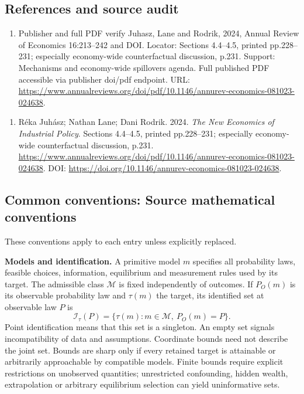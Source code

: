 \documentclass[11pt,a4paper]{article}
\begin{document}
\subsection*{References and source audit}
\begin{enumerate}
\item Publisher and full PDF verify Juhasz, Lane and Rodrik, 2024, Annual Review of Economics 16:213--242 and DOI. Locator: Sections 4.4--4.5, printed pp.228--231; especially economy-wide counterfactual discussion, p.231. Support: Mechanisms and economy-wide spillovers agenda. Full published PDF accessible via publisher doi/pdf endpoint. URL: \url{https://www.annualreviews.org/doi/pdf/10.1146/annurev-economics-081023-024638}.
\end{enumerate}
\begin{enumerate}\raggedright
\item\hypertarget{definitions:source:30007628:1}{} Réka Juhász; Nathan Lane; Dani Rodrik. 2024. \emph{The New Economics of Industrial Policy}. Sections 4.4--4.5, printed pp.228--231; especially economy-wide counterfactual discussion, p.231.
\url{https://www.annualreviews.org/doi/pdf/10.1146/annurev-economics-081023-024638}.
DOI: \url{https://doi.org/10.1146/annurev-economics-081023-024638}.
\end{enumerate}

\subsection*{Common conventions: Source mathematical conventions}

These conventions apply to each entry unless explicitly replaced.

\textbf{Models and identification.} A primitive model \(m\) specifies all probability laws, feasible choices, information, equilibrium and measurement rules used by its target. The admissible class \(\mathcal M\) is fixed independently of outcomes. If \(P_O(m)\) is its observable probability law and \(\tau(m)\) the target, its identified set at observable law \(P\) is
\[
 \mathcal I_\tau(P)=\{\tau(m):m\in\mathcal M,\ P_O(m)=P\}.
\]
Point identification means that this set is a singleton. An empty set signals incompatibility of data and assumptions. Coordinate bounds need not describe the joint set. Bounds are sharp only if every retained target is attainable or arbitrarily approachable by compatible models. Finite bounds require explicit restrictions on unobserved quantities; unrestricted confounding, hidden wealth, extrapolation or arbitrary equilibrium selection can yield uninformative sets.
\end{document}
